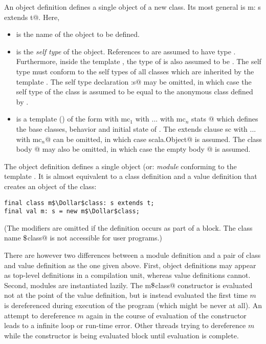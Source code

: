 \documentclass[11pt]{report}
\begin{document}
An object definition defines a single object of a new class. Its 
most general is
\verb@object m: s extends t@. Here,
\begin{itemize}
\item[]
\verb@m@ is the name of the object to be defined.
\item[] \verb@s@ is the {\em self type} of the object. References to
\verb@m@ are assumed to have type \verb@s@. Furthermore, inside the
template \verb@t@, the type of \verb@this@ is also assumed to be \verb@s@.
The self type must conform to the self types of all classes which are
inherited by the template \verb@t@. The self type declaration
\verb@:s@ may be omitted, in which case the self type of the class is
assumed to be equal to the anonymous class defined by \verb@t@.
\item[] 
\verb@t@ is a
template () of the form
\verb@sc with mc$_1$ with ... with mc$_n$ { stats }@
which defines the base classes, behavior and initial state of \verb@m@.
The extends clause \verb@extends sc with ... with mc$_n$@
can be omitted, in which case
\verb@extends scala.Object@ is assumed.  The class body
@ may also be omitted, in which case the empty body
\verb@{}@ is assumed.
\end{itemize}
The object definition defines a single object (or: {\em module} 
conforming to the template \verb@t@.  It is almost equivalent to a class
definition and a value definition that creates an object of the class:
\begin{verbatim}
final class m$\Dollar$class: s extends t;
final val m: s = new m$\Dollar$class;
\end{verbatim}
(The \verb@final@ modifiers are omitted if the definition occurs as
part of a block. The class name \verb@m$\Dollar$class@ is not
accessible for user programs.)

There are however two differences between a module definition and a
pair of class and value definition as the one given above.  First,
object definitions may appear as top-level definitions in a
compilation unit, whereas value definitions cannot.  Second, modules
are instantiated lazily.  The \verb@new m$\Dollar$class@ constructor
is evaluated not at the point of the value definition, but is instead
evaluated the first time $m$ is dereferenced during execution of the
program (which might be never at all). An attempt to dereference $m$
again in the course of evaluation of the constructor leads to a
infinite loop or run-time error.  Other threads trying to dereference
$m$ while the constructor is being evaluated block until evaluation is
complete. 
\end{document}
